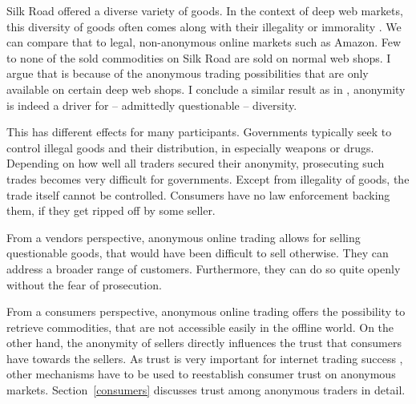 Silk Road offered a diverse variety of goods. In the context of deep web markets, this diversity of goods often comes along with their illegality or immorality \cite{silkroad2013}. We can compare that to legal, non-anonymous online markets such as Amazon. Few to none of the sold commodities on Silk Road are sold on normal web shops. I argue that is because of the anonymous trading possibilities that are only available on certain deep web shops. I conclude a similar result as in \cite{accountability2014}, anonymity is indeed a driver for -- admittedly questionable -- diversity.

This has different effects for many participants. Governments typically seek to control illegal goods and their distribution, in especially weapons or drugs. Depending on how well all traders secured their anonymity, prosecuting such trades becomes very difficult for governments. Except from illegality of goods, the trade itself cannot be controlled. Consumers have no law enforcement backing them, if they get ripped off by some seller.

From a vendors perspective, anonymous online trading allows for selling questionable goods, that would have been difficult to sell otherwise. They can address a broader range of customers. Furthermore, they can do so quite openly without the fear of prosecution.

From a consumers perspective, anonymous online trading offers the possibility to retrieve commodities, that are not accessible easily in the offline world. On the other hand, the anonymity of sellers directly influences the trust that consumers have towards the sellers. As trust is very important for internet trading success \cite{internetTrust2004}, other mechanisms  have to be used to reestablish consumer trust on anonymous markets. Section~\ref{consumers} discusses trust among anonymous traders in detail.